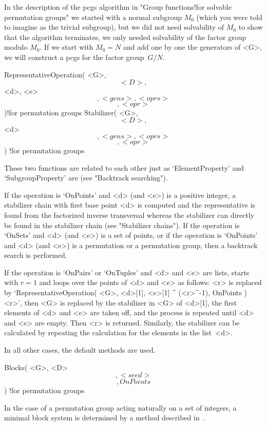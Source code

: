 In the description of the pcgs algorithm in "Group functions!for solvable
permutation groups" we started  with a normal  subgroup $M_0$  (which you
were  told  to imagine  as the trivial   subgroup), but  we  did not need
solvability  of $M_0$  to  show that the   algorithm  terminates, we only
needed solvability  of the  factor group modulo  $M_0$.  If we start with
$M_0=N$ and add one by  one the generators of <G>,   we will construct  a
pcgs for the factor group~$G/N$.


\>RepresentativeOperation( <G>, \[ <D>, \] <d>, <e> \[, <gens>, <oprs> %
                           \] \[, <opr> \] )!{for permutation groups}
\>Stabilizer( <G>, \[ <D>, \] <d> \[, <gens>, <oprs> \] \[, <opr> \] )%
  !{for permutation groups}

These two  functions are related  to each other just as `ElementProperty'
and `SubgroupProperty' are (see "Backtrack searching").

If the operation is `OnPoints' and <d> (and <e>) is a positive integer, a
stabilizer   chain  with  first  base  point  <d>   is  computed  and the
representative is found  from the factorized inverse  transversal whereas
the stabilizer  can   directly be  found  in the   stabilizer chain  (see
"Stabilizer chains"). If the operation is `OnSets' and <d> (and <e>) is a
set of points, or if  the operation is `OnPoints' and  <d> (and <e>) is a
permutation or a permutation group, then a backtrack search is performed.

If the operation  is `OnPairs' or `OnTuples'  and <d> and  <e> are lists,
{\GAP} starts with  $r = 1$ and  loops over the points of  <d> and <e> as
follows: <r> is replaced by `RepresentativeOperation( <G>, <d>[1], <e>[1]
^ (<r>^-1), OnPoints ) \* <r>', then <G> is replaced by the stabilizer in
<G> of <d>[1], the first elements of <d>  and <e> are  taken off, and the
process  is repeated until <d>  and <e> are empty.  Then <r> is returned.
Similarly, the stabilizer can be  calculated by repeating the calculation
for the elements in the list~<d>.

In all other cases, the default methods are used.

\>Blocks( <G>, <D> \[, <seed> \] \[, OnPoints \] )%
  !{for permutation groups}

In the case of a permutation group acting naturally on a set of integers,
a   minimal  block   system   is   determined  by   a  method   described
in~\cite{SS94}.

